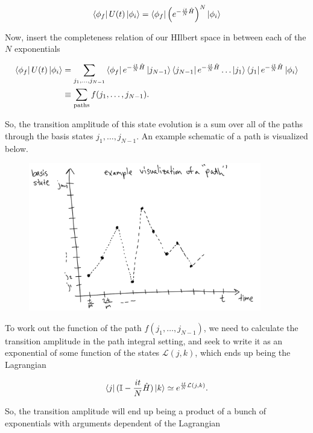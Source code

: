 \begin{equation}
\bra{\phi_f} U(t) \ket{\phi_i} = \bra{\phi_f}  \left( e^{-\frac{it}{N}\hat{H}}  \right) ^N \ket{\phi_i}
\end{equation}

\noindent Now, insert the completeness relation of our HIlbert space in between each of the $N$ exponentials

\begin{align}
\bra{\phi_f} U(t) \ket{\phi_i} &= \sum_{j_1,\dots,j_{N-1}} \bra{\phi_f} e^{-\frac{it}{N}\hat{H}} \ket{j_{N-1}}\bra{j_{N-1}} e^{-\frac{it}{N}\hat{H}} \dots \ket{j_1}\bra{j_1} e^{-\frac{it}{N}\hat{H}} \ket{\phi_i} \\
&\equiv \sum_{\text{paths}} f(j_1, \dots , j_{N-1}).
\end{align}

\noindent So, the transition amplitude of this state evolution is a sum over all of the paths through the basis states $j_1,\dots,j_{N-1}$. An example schematic of a path is visualized below.

\begin{figure}[H]
	\centering
	\includegraphics[width=4in]{images/pathviz.png}
\end{figure}

\noindent To work out the function of the path $f(j_1, \dots, j_{N-1})$, we need to calculate the transition amplitude in the path integral setting, and seek to write it as an exponential of some function of the states $\mathcal{L}(j,k)$, which ends up being the Lagrangian

\begin{equation}
\bra{j} (\mathbb{I} - \frac{it}{N} \hat{H}) \ket{k} \simeq e^{\frac{it}{N} \mathcal{L}(j,k)}.
\end{equation}

\noindent So, the transition amplitude will end up being a product of a bunch of exponentials with arguments dependent of the Lagrangian

